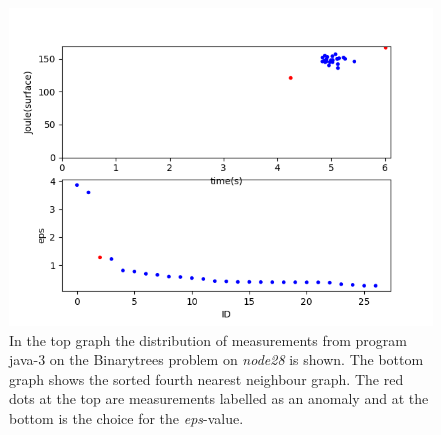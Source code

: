 \begin{figure}[h]
    \centering
    \includegraphics[width=.6\textwidth]{graphs/port3-bdscan-java-3-problem0-eps1-27.png}
    \caption{In the top graph the distribution of measurements from program java-3 on the Binarytrees problem on \textit{node28} is shown. The bottom graph shows the sorted fourth nearest neighbour graph. The red dots at the top are measurements labelled as an anomaly and at the bottom is the choice for the \textit{eps}-value.}
    \label{fig:anomalies}
\end{figure}

